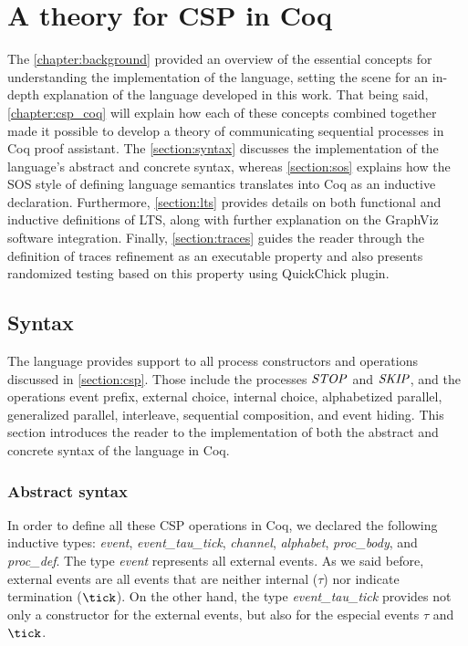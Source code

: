 \chapter{A theory for CSP in Coq}
\label{chapter:csp_coq}

The \autoref{chapter:background} provided an overview of the essential concepts for understanding the implementation of the \CSPcoq{} language, setting the scene for an in-depth explanation of the language developed in this work. That being said, \autoref{chapter:csp_coq} will explain how each of these concepts combined together made it possible to develop a theory of communicating sequential processes in Coq proof assistant. The \autoref{section:syntax} discusses the implementation of the language's abstract and concrete syntax, whereas \autoref{section:sos} explains how the SOS style of defining language semantics translates into Coq as an inductive declaration. Furthermore, \autoref{section:lts} provides details on both functional and inductive definitions of LTS, along with further explanation on the GraphViz software integration. Finally, \autoref{section:traces} guides the reader through the definition of traces refinement as an executable property and also presents randomized testing based on this property using QuickChick plugin.

\section{Syntax}
\label{section:syntax}

The \CSPcoq{} language provides support to all process constructors and operations discussed in \autoref{section:csp}. Those include the processes $ \mathit{\mathord{{STOP}}} $ and $ \mathit{\mathord{{SKIP}}} $, and the operations event prefix, external choice, internal choice, alphabetized parallel, generalized parallel, interleave, sequential composition, and event hiding. This section introduces the reader to the implementation of both the abstract and concrete syntax of the \CSPcoq{} language in Coq.

\subsection{Abstract syntax}

In order to define all these CSP operations in Coq, we declared the following inductive types: \emph{event}, \emph{event\_tau\_tick}, \emph{channel}, \emph{alphabet}, \emph{proc\_body}, and \emph{proc\_def}. The type \emph{event} represents all external events. As we said before, external events are all events that are neither internal ($ \tau $) nor indicate termination ($ \tick $). On the other hand, the type \emph{event\_tau\_tick} provides not only a constructor for the external events, but also for the especial events $ \tau $ and $ \tick $.

